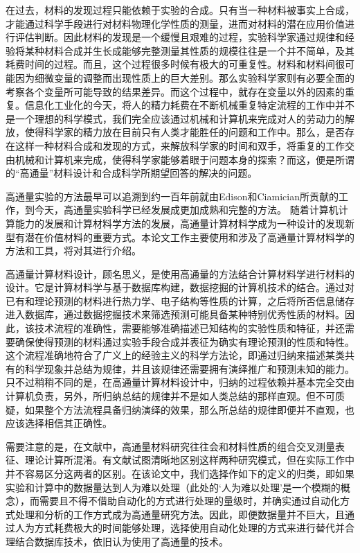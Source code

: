 在过去，材料的发现过程只能依赖于实验的合成。只有当一种材料被事实上合成，才能通过科学手段进行对材料物理化学性质的测量，进而对材料的潜在应用价值进行评估判断。因此材料的发现是一个缓慢且艰难的过程，实验科学家通过规律和经验将某种材料合成并生长成能够完整测量其性质的规模往往是一个并不简单，及其耗费时间的过程。而且，这个过程很多时候有极大的可重复性。材料和材料间很可能因为细微变量的调整而出现性质上的巨大差别。那么实验科学家则有必要全面的考察各个变量所可能导致的结果差异。而这个过程中，就存在变量以外的因素的重复。信息化工业化的今天，将人的精力耗费在不断机械重复特定流程的工作中并不是一个理想的科学模式，我们完全应该通过机械和计算机来完成对人的劳动力的解放，使得科学家的精力放在目前只有人类才能胜任的问题和工作中。那么，是否存在这样一种材料合成和发现的方式，来解放科学家的时间和双手，将重复的工作交由机械和计算机来完成，使得科学家能够着眼于问题本身的探索？而这，便是所谓的“高通量”材料设计和合成科学所期望回答的解决的问题。

高通量实验的方法最早可以追溯到约一百年前就由Edison和Ciamician\cite{ciamician1912photochemistry}所贡献的工作，到今天，高通量实验科学已经发展成更加成熟和完整的方法\cite{curtarolo2003predicting,ceder1998identification,johannesson2002combined,curtarolo2005accuracy,xiang1995combinatorial,koinuma2004combinatorial,takeuchi2003identification}。
随着计算机计算能力的发展和计算材料学方法的发展，高通量计算材料学成为一种设计的发现新型有潜在价值材料的重要方式。本论文工作主要使用和涉及了高通量计算材料学的方法和工具，将对其进行介绍。

高通量计算材料设计，顾名思义，是使用高通量的方法结合计算材料学进行材料的设计。它是计算材料学与基于数据库构建，数据挖掘的计算机技术的结合。通过对已有和理论预测的材料进行热力学、电子结构等性质的计算，之后将所否信息储存进入数据库，通过数据挖掘技术来筛选预测可能具备某种特别优秀性质的材料。因此，该技术流程的准确性，需要能够准确描述已知结构的实验性质和特征，并还需要确保使得预测的材料通过实验手段合成并表征为确实有理论预测的性质和特性。这个流程准确地符合了广义上的经验主义的科学方法论，即通过归纳来描述某类共有的科学现象并总结为规律，并且该规律还需要拥有演绎推广和预测未知的能力。只不过稍稍不同的是，在高通量计算材料设计中，归纳的过程依赖并基本完全交由计算机负责，另外，所归纳总结的规律并不是如人类总结的那样直观。但不可质疑，如果整个方法流程具备归纳演绎的效果，那么所总结的规律即便并不直观，也应该选择相信其正确性。

需要注意的是，在文献中，高通量材料研究往往会和材料性质的组合交叉测量表征、理论计算所混淆。有文献\cite{maclean1999glossary,maier2007combinatorial}试图清晰地区别这样两种研究模式，但在实际工作中并不容易区分这两者的区别。在该论文中，我们选择作如下的定义的归类，即如果实验和计算中的数据量达到人为难以处理（此处的‘人为难以处理’是一个模糊的概念），而需要且不得不借助自动化的方式进行处理的量级时，并确实通过自动化方式处理和分析的工作方式成为高通量研究方法。因此，即便数据量并不巨大，且通过人为方式耗费极大的时间能够处理，选择使用自动化处理的方式来进行替代并合理结合数据库技术，依旧认为使用了高通量的技术。

